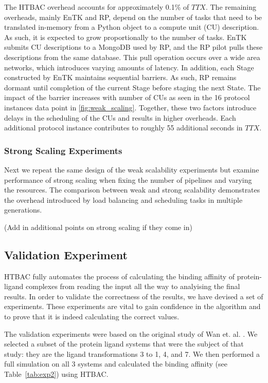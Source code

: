 The HTBAC overhead accounts for approximately 0.1\% of \(TTX\). The remaining
overheads, mainly EnTK and RP, depend on the number of tasks that need to be
translated in-memory from a Python object to a compute unit (CU) description.
As such, it is expected to grow proportionally to the number of tasks. EnTK
submits CU descriptions to a MongoDB used by RP, and the RP pilot pulls these
descriptions from the same database. This pull operation occurs over a wide
area networks, which introduces varying amounts of latency. In addition, each
Stage constructed by EnTK maintains sequential barriers. As such, RP remains
dormant until completion of the current Stage before staging the next State.
The impact of the barrier increases with number of CUs as seen in the 16
protocol instances data point in \ref{fig:weak_scaling}.  Together, these two
factors introduce delays in the scheduling of the CUs and results in higher
overheads. Each additional protocol instance contributes to roughly 55
additional seconds in \(TTX\).


\subsubsection {Strong Scaling Experiments}

Next we repeat the same design of the weak scalability experiments but examine
performance of strong scaling when fixing the number of pipelines and varying
the resources. The comparison between weak and strong scalability demonstrates
the overhead introduced by load balancing and scheduling tasks in multiple
generations.

(Add in additional points on strong scaling if they come in)



\subsection{Validation Experiment}

HTBAC fully automates the process of calculating the binding affinity of
protein-ligand complexes from reading the input all the way to analyising the
final results. In order to validate the correctness of the results, we have
devised a set of experiments. These experiments are vital to gain confidence
in the algorithm and to prove that it is indeed calculating the correct values.

The validation experiments were based on the original study of Wan et. al.
\cite{Wan2017brd4}. We selected a subset of the protein ligand systems that
were the subject of that study: they are the ligand transformations 3 to 1, 4,
and 7. We then performed a full simulation on all 3 systems and calculated the
binding affinity (see Table~\ref{tab:exp2}) using HTBAC.

